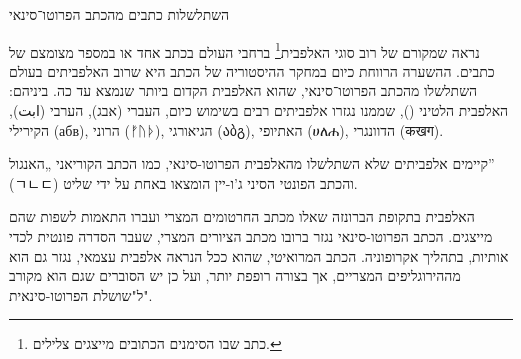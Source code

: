 השתלשלות כתבים מהכתב הפרוטו־סינאי

נראה שמקורם של רוב סוגי האלפבית\footnote{כתב שבו הסימנים הכתובים מייצגים צלילים.} ברחבי העולם בכתב אחד או במספר מצומצם של כתבים. ההשערה הרווחת כיום במחקר ההיסטוריה של הכתב היא שרוב האלפביתים בעולם השתלשלו מהכתב הפרוטו־סינאי, שהוא האלפבית הקדום ביותר שנמצא עד כה. ביניהם: האלפבית הלטיני (), שממנו נגזרו אלפביתים רבים בשימוש כיום, העברי (אבג), הערבי (ابت), הקירילי (абв), הרוני (ᚠᚢᚦ), הגיאורגי (აბგ), האתיופי (ሀለሐ), הדוונגרי (कखग).

קיימים אלפביתים שלא השתלשלו מהאלפבית הפרוטו-סינאי, כמו הכתב הקוריאני „האנגול” (ㄱㄴㄷ) והכתב הפונטי הסיני ג'ו-יין הומצאו באחת על ידי שליט.

האלפבית בתקופת הברונזה שאלו מכתב החרטומים המצרי ועברו התאמות לשפות שהם מייצגים. הכתב הפרוטו-סינאי נגזר ברובו מכתב הציורים המצרי, שעבר הסדרה פונטית לכדי אותיות, בתהליך אקרופוניה. הכתב המרואיטי, שהוא ככל הנראה אלפבית עצמאי, נגזר גם הוא מההירוגליפים המצריים, אך בצורה רופפת יותר, ועל כן יש הסוברים שגם הוא מקורב ל"שושלת הפרוטו-סינאית".

